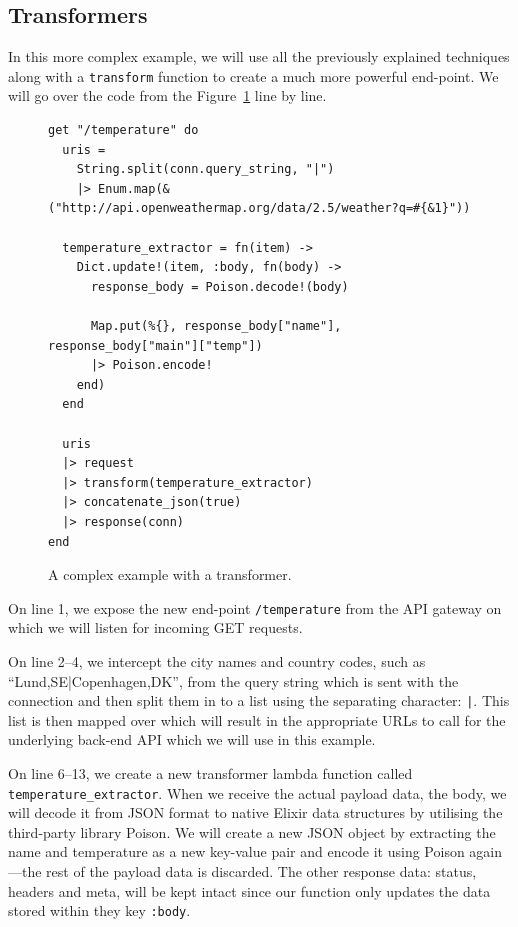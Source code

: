 \documentclass{cslthse-msc}
\begin{document}
\subsection{Transformers}
In this more complex example, we will use all the previously explained techniques along with a \lstinline{transform} function to create a much more powerful end-point. We will go over the code from the Figure~\ref{fig:code_transformer} line by line.

\begin{figure}[H]
  \centering
\begin{lstlisting}[breaklines=true,frame=single]
get "/temperature" do
  uris =
    String.split(conn.query_string, "|")
    |> Enum.map(&("http://api.openweathermap.org/data/2.5/weather?q=#{&1}"))

  temperature_extractor = fn(item) ->
    Dict.update!(item, :body, fn(body) ->
      response_body = Poison.decode!(body)

      Map.put(%{}, response_body["name"], response_body["main"]["temp"])
      |> Poison.encode!
    end)
  end

  uris
  |> request
  |> transform(temperature_extractor)
  |> concatenate_json(true)
  |> response(conn)
end
\end{lstlisting}
  \caption{A complex example with a transformer.}
  \label{fig:code_transformer}
\end{figure}

On line 1, we expose the new end-point \lstinline{/temperature} from the API gateway on which we will listen for incoming GET requests.

On line 2--4, we intercept the city names and country codes, such as \enquote{Lund,SE|Copenhagen,DK}, from the query string which is sent with the connection and then split them in to a list using the separating character: \lstinline{|}. This list is then mapped over which will result in the appropriate URLs to call for the underlying back-end API which we will use in this example.

On line 6--13, we create a new transformer lambda function called \lstinline{temperature_extractor}. When we receive the actual payload data, the body, we will decode it from JSON format to native Elixir data structures by utilising the third-party library Poison\cite{poison}. We will create a new JSON object by extracting the name and temperature as a new key-value pair and encode it using Poison again---the rest of the payload data is discarded. The other response data: status, headers and meta, will be kept intact since our function only updates the data stored within they key \lstinline{:body}.
\end{document}
